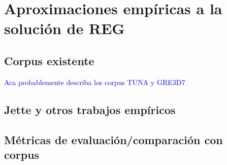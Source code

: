




\section{Aproximaciones emp\'iricas a la soluci\'on de REG}



\subsection{Corpus existente}
\label{sec:corpus-existente}
\textcolor{blue}{Aca probablemente describa los corpus TUNA y GRE3D7}
\label{sec:corpusGRE}
\label{sec:corpusTUNA}

\subsection{Jette y otros trabajos emp\'iricos}

\subsection{M\'etricas de evaluaci\'on/comparaci\'on con corpus}




